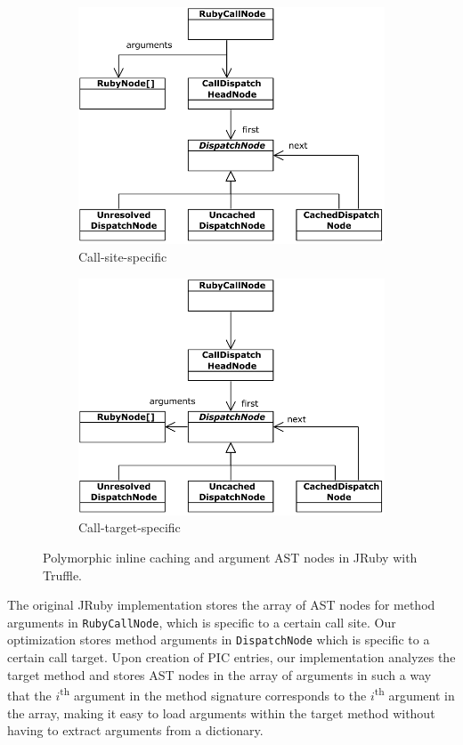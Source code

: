 \documentclass{sigplanconf} %
\begin{document}
\begin{figure}
        \centering
        \begin{subfigure}{.48\linewidth}
          \centering
          \includegraphics[width=.75\linewidth]{resources/dispatch}
          \caption{Call-site-specific}
        \end{subfigure}
        \hspace{1em}
        \begin{subfigure}{.48\linewidth}
          \centering
          \includegraphics[width=.75\linewidth]{resources/dispatch_opt}
          \caption{Call-target-specific}
        \end{subfigure}
    \caption{Polymorphic inline caching and argument AST nodes in JRuby with Truffle.}
    \label{fig:pic_jruby}
\end{figure}

The original JRuby implementation stores the array of AST nodes for method arguments in \lstinline{RubyCallNode}, which is specific to a certain call site. Our optimization stores method arguments in \lstinline{DispatchNode} which is specific to a certain call target. Upon creation of PIC entries, our implementation analyzes the target method and stores AST nodes in the array of arguments in such a way that the $i$\textsuperscript{th} argument in the method signature corresponds to the $i$\textsuperscript{th} argument in the array, making it easy to load arguments within the target method without having to extract arguments from a dictionary.
\end{document}
